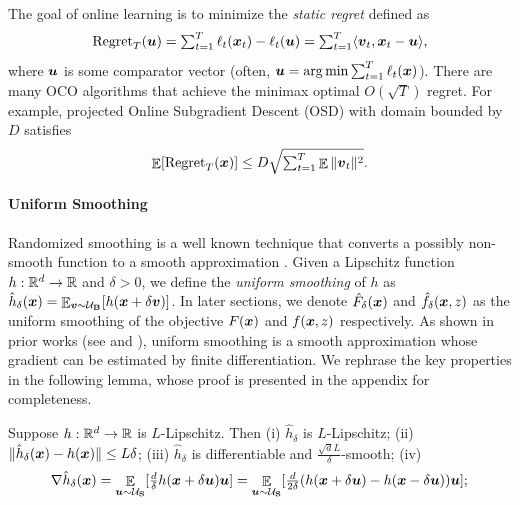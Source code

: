 The goal of online learning is to minimize the \textit{static regret} defined as
\begin{equation*}
    \textstyle
    \mathrm{Regret}_T({\boldsymbol{u}}) = \sum_{t=1}^T \ell_t({\boldsymbol{x}}_t) - \ell_t({\boldsymbol{u}}) = \sum_{t=1}^T \langle {\boldsymbol{v}}_t,{\boldsymbol{x}}_t-{\boldsymbol{u}} \rangle,
\end{equation*}
where ${\boldsymbol{u}}$ is some comparator vector (often, ${\boldsymbol{u}}=\mathop{\operatorname{arg\,min}} \sum_{t=1}^T \ell_t({\boldsymbol{x}})$). 
There are many OCO algorithms that achieve the minimax optimal $O(\sqrt{T})$ regret. For example, projected Online Subgradient Descent (OSD) \citep{zinkevich2003online} with domain bounded by $D$ satisfies
\begin{equation*}
    \textstyle
    \mathop{\mathbb{E}}[\mathrm{Regret}_T({\boldsymbol{x}})] \le D\sqrt{\sum_{t=1}^T \mathop{\mathbb{E}}\|{\boldsymbol{v}}_t\|^2}.
\end{equation*}


\paragraph{Uniform Smoothing}

Randomized smoothing is a well known technique that converts a possibly non-smooth function to a smooth approximation \citep{flaxman2005online, duchi2012randomized, lin2022gradient}.
Given a Lipschitz function $h:\mathbb R^d\to\mathbb R$ and $\delta>0$, we define the \textit{uniform smoothing} of $h$ as $\hat h_\delta({\boldsymbol{x}}) = \mathop{\mathbb{E}}_{{\boldsymbol{v}}\sim{\cal U}_{\mathbf{B}}}[h({\boldsymbol{x}}+\delta{\boldsymbol{v}})]$. In later sections, we denote $\hat F_\delta({\boldsymbol{x}})$ and $\hat f_\delta({\boldsymbol{x}},z)$ as the uniform smoothing of the objective $F({\boldsymbol{x}})$ and $f({\boldsymbol{x}},z)$ respectively. 
As shown in prior works (see \citep{yousefian2012stochastic} and \citet[Section E]{duchi2012randomized}), uniform smoothing is a smooth approximation whose gradient can be estimated by finite differentiation. We rephrase the key properties in the following lemma, whose proof is presented in the appendix for completeness.

\begin{lemma}
\label{lem:DP-O2NC:uniform-smoothing}
Suppose $h:\mathbb R^d\to\mathbb R$ is $L$-Lipschitz.
Then (i) $\hat h_\delta$ is $L$-Lipschitz; (ii) $\|\hat h_\delta({\boldsymbol{x}}) - h({\boldsymbol{x}})\| \le L\delta$; (iii) $\hat h_\delta$ is differentiable and $\frac{\sqrt{d}L}{\delta}$-smooth; (iv) 
\begin{equation*}
    \nabla \hat h_\delta({\boldsymbol{x}}) 
    = \mathop{\mathbb{E}}_{{\boldsymbol{u}}\sim{\cal U}_{\mathbf{S}}}[\tfrac{d}{\delta} h({\boldsymbol{x}}+\delta{\boldsymbol{u}}){\boldsymbol{u}}]
    = \mathop{\mathbb{E}}_{{\boldsymbol{u}}\sim{\cal U}_{\mathbf{S}}}[\tfrac{d}{2\delta} (h({\boldsymbol{x}}+\delta{\boldsymbol{u}}) - h({\boldsymbol{x}}-\delta{\boldsymbol{u}})) {\boldsymbol{u}} ];
\end{equation*}
\end{lemma}

